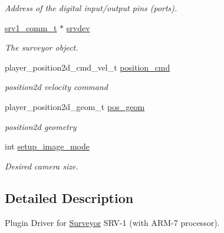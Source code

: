 \begin{CompactItemize}
\begin{CompactList}\small\item\em Address of the digital input/output pins (ports). \item\end{CompactList}\item 
\hypertarget{classSurveyor_2944f9704a7846b9607c5fc330f51a0a}{
\hyperlink{structsrv1__comm__t}{srv1\_\-comm\_\-t} $\ast$ \hyperlink{classSurveyor_2944f9704a7846b9607c5fc330f51a0a}{srvdev}}
\label{classSurveyor_2944f9704a7846b9607c5fc330f51a0a}

\begin{CompactList}\small\item\em The surveyor object. \item\end{CompactList}\item 
\hypertarget{classSurveyor_1633824b8c32a4dc48aecafb5f775956}{
player\_\-position2d\_\-cmd\_\-vel\_\-t \hyperlink{classSurveyor_1633824b8c32a4dc48aecafb5f775956}{position\_\-cmd}}
\label{classSurveyor_1633824b8c32a4dc48aecafb5f775956}

\begin{CompactList}\small\item\em position2d velocity command \item\end{CompactList}\item 
\hypertarget{classSurveyor_d59f0d50a970033851d0c6e6e72d48b7}{
player\_\-position2d\_\-geom\_\-t \hyperlink{classSurveyor_d59f0d50a970033851d0c6e6e72d48b7}{pos\_\-geom}}
\label{classSurveyor_d59f0d50a970033851d0c6e6e72d48b7}

\begin{CompactList}\small\item\em position2d geometry \item\end{CompactList}\item 
\hypertarget{classSurveyor_a9a8bda99bee792ea04267b650a4e161}{
int \hyperlink{classSurveyor_a9a8bda99bee792ea04267b650a4e161}{setup\_\-image\_\-mode}}
\label{classSurveyor_a9a8bda99bee792ea04267b650a4e161}

\begin{CompactList}\small\item\em Desired camera size. \item\end{CompactList}\end{CompactItemize}


\subsection{Detailed Description}
Plugin Driver for \hyperlink{classSurveyor}{Surveyor} SRV-1 (with ARM-7 processor). 

